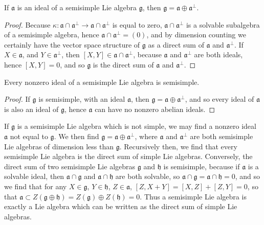 \begin{lemma}
    If $\mathfrak{a}$ is an ideal of a semisimple Lie algebra $\mathfrak{g}$, then $\mathfrak{g} = \mathfrak{a} \oplus \mathfrak{a}^\perp$.
\end{lemma}
\begin{proof}
    Because $\kappa: \mathfrak{a} \cap \mathfrak{a}^\perp \to \mathfrak{a} \cap \mathfrak{a}^\perp$ is equal to zero, $\mathfrak{a} \cap \mathfrak{a}^\perp$ is a solvable subalgebra of a semisimple algebra, hence $\mathfrak{a} \cap \mathfrak{a}^\perp = (0)$, and by dimension counting we certainly have the vector space structure of $\mathfrak{g}$ as a direct sum of $\mathfrak{a}$ and $\mathfrak{a}^\perp$. If $X \in \mathfrak{a}$, and $Y \in \mathfrak{a}^\perp$, then $[X,Y] \in \mathfrak{a} \cap \mathfrak{a}^\perp$, because $\mathfrak{a}$ and $\mathfrak{a}^\perp$ are both ideals, hence $[X,Y] = 0$, and so $\mathfrak{g}$ is the direct sum of $\mathfrak{a}$ and $\mathfrak{a}^\perp$.
\end{proof}

\begin{corollary}
    Every nonzero ideal of a semisimple Lie algebra is semisimple.
\end{corollary}
\begin{proof}
    If $\mathfrak{g}$ is semisimple, with an ideal $\mathfrak{a}$, then $\mathfrak{g} = \mathfrak{a} \oplus \mathfrak{a}^\perp$, and so every ideal of $\mathfrak{a}$ is also an ideal of $\mathfrak{g}$, hence $\mathfrak{a}$ can have no nonzero abelian ideals.
\end{proof}

If $\mathfrak{g}$ is a semisimple Lie algebra which is not simple, we may find a nonzero ideal $\mathfrak{a}$ not equal to $\mathfrak{g}$. We then find $\mathfrak{g} = \mathfrak{a} \oplus \mathfrak{a}^\perp$, where $\mathfrak{a}$ and $\mathfrak{a}^\perp$ are both semisimple Lie algebras of dimension less than $\mathfrak{g}$. Recursively then, we find that every semisimple Lie algebra is the direct sum of simple Lie algebras. Conversely, the direct sum of two semisimple Lie algebras $\mathfrak{g}$ and $\mathfrak{h}$ is semisimple, because if $\mathfrak{a}$ is a solvable ideal, then $\mathfrak{a} \cap \mathfrak{g}$ and $\mathfrak{a} \cap \mathfrak{h}$ are both solvable, so $\mathfrak{a} \cap \mathfrak{g} = \mathfrak{a} \cap \mathfrak{h} = 0$, and so we find that for any $X \in \mathfrak{g}$, $Y \in \mathfrak{h}$, $Z \in \mathfrak{a}$, $[Z,X + Y] = [X,Z] + [Z,Y] = 0$, so that $\mathfrak{a} \subset Z(\mathfrak{g} \oplus \mathfrak{h}) = Z(\mathfrak{g}) \oplus Z(\mathfrak{h}) = 0$. Thus a semisimple Lie algebra is exactly a Lie algebra which can be written as the direct sum of simple Lie algebras.

